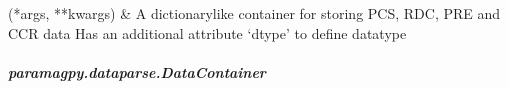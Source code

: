 \documentclass[a4paper,10pt,english,openany,oneside]{sphinxmanual}
\begin{document}
\begin{savenotes}\sphinxatlongtablestart\begin{longtable}[c]{}
\hline

\endfirsthead

%
{}\\
\hline

\endhead

\hline
{}\\
\endfoot

\endlastfoot

\sphinxAtStartPar
{\hyperref[\detokenize{reference/generated/paramagpy.dataparse.DataContainer:paramagpy.dataparse.DataContainer}]{}}(*args, **kwargs)
&
\sphinxAtStartPar
A dictionary\sphinxhyphen{}like container for storing PCS, RDC, PRE and CCR data Has an additional attribute ‘dtype’ to define datatype
\\
\hline
\end{longtable}\sphinxatlongtableend\end{savenotes}


\subparagraph{paramagpy.dataparse.DataContainer}
\label{\detokenize{reference/generated/paramagpy.dataparse.DataContainer:paramagpy-dataparse-datacontainer}}\label{\detokenize{reference/generated/paramagpy.dataparse.DataContainer::doc}}
\end{document}
